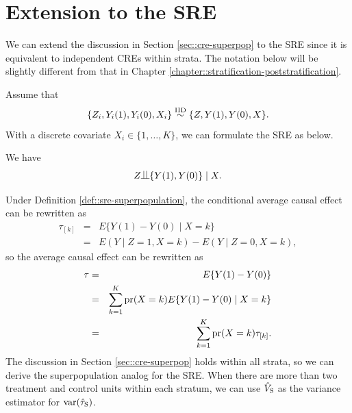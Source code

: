 \section{Extension to the SRE}

We can extend the discussion in Section \ref{sec::cre-superpop} to the SRE since it is equivalent to independent CREs within strata. 
The notation below will be slightly different from that in Chapter \ref{chapter::stratification-poststratification}. 


Assume that 
$$
\{ Z_i,  Y_i(1), Y_i(0) ,  X_i  \}  \stackrel{\textup{IID}}{\sim} \{ Z,  Y(1), Y(0), X  \} .
$$ 
With a discrete covariate $ X_i \in \{ 1,\ldots, K\}$, we can formulate the SRE as below.


\begin{definition}
\label{def::sre-superpopulation}
We have 
$$
Z\ind\{  Y(1), Y(0) \} \mid   X  .
$$
\end{definition}


Under Definition \ref{def::sre-superpopulation},  the conditional average causal effect can be rewritten as
\begin{eqnarray*}
\tau_{[k]}  &=&  E\{   Y(1) -  Y(0)  \mid X= k \} \\
&=& E(Y\mid Z=1, X=k) - E(Y\mid Z=0, X=k),
\end{eqnarray*}
so the average causal effect can be rewritten as
\begin{eqnarray*}
\tau &=&   E\{   Y(1) -  Y(0)   \}  \\
&=& \sum_{k=1}^K \textup{pr}(X = k) E\{   Y(1) -  Y(0)  \mid X = k \} \\
&=& \sum_{k=1}^K \textup{pr}(X  = k) \tau_{[k]} .
\end{eqnarray*}
%
The discussion in Section \ref{sec::cre-superpop} holds within all strata, so we can derive the superpopulation analog for the SRE. When there are more than two treatment and control units within each stratum, we can use $\hat{V}_\textsc{S}$ as the variance estimator for $\textup{var}( \hat{\tau}_\textsc{S} )$. 


